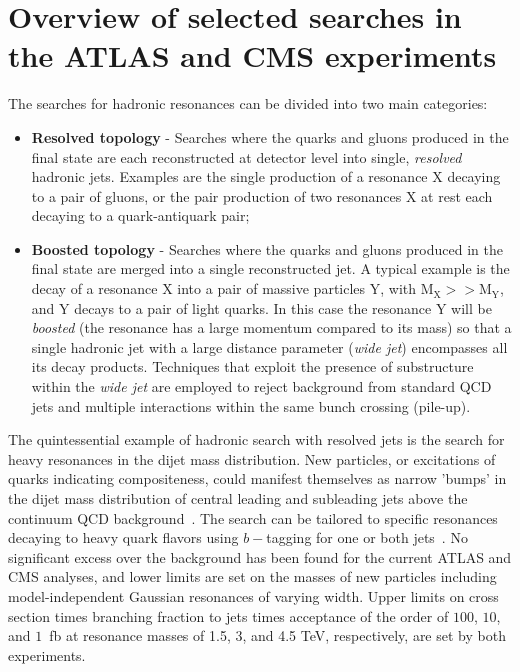 \documentclass{PoS}
\begin{document}
\section{Overview of selected searches in the ATLAS and CMS experiments}

The searches for hadronic resonances can be divided into two main categories:
\begin{itemize}
 \item {\bf Resolved topology} - Searches where the quarks and gluons produced in the final state are each reconstructed at detector level into single,  \textit{resolved} hadronic jets. Examples are the single production of a resonance X decaying to a pair of gluons, or the pair production of two resonances X at rest each decaying to a quark-antiquark pair;
 \item {\bf Boosted topology} - Searches where the quarks and gluons produced in the final state are merged into a single reconstructed jet.  A typical example is the decay of a resonance X into a pair of massive particles Y, with $\mbox{M}_{\mbox{X}} >>\mbox{M}_{\mbox{Y}} $, and Y decays to a pair of light quarks. In this case the resonance Y will be \textit{boosted} 
(the resonance has a large momentum compared to its mass) so that a single hadronic jet with a large distance 
parameter (\textit{wide jet}) encompasses all its decay products. Techniques that exploit the presence of substructure within the \textit{wide jet} are employed to reject background from standard QCD jets and multiple interactions within the same bunch crossing (pile-up). 
\end{itemize}

The quintessential example of hadronic search with resolved jets is the 
search for heavy resonances in the dijet mass distribution. New particles, 
or excitations of quarks indicating 
compositeness,
could manifest 
themselves as narrow 'bumps' in the dijet mass distribution of central leading
and subleading jets above the continuum QCD background~\cite{CMS-PAS-EXO-12-059, ATLAS-CONF-2012-148}. 
The search can be tailored to specific resonances
decaying to heavy quark flavors using $b-$tagging for one or both jets~\cite{CMS-PAS-EXO-12-023}. 
No significant excess over the background has been found for the current ATLAS and CMS analyses,
and lower limits are set on the masses of new particles 
including model-independent Gaussian resonances of varying width.
Upper limits on cross section times branching fraction to jets times acceptance of the order of $100$, $10$, and 
$1$~fb at resonance masses of 1.5, 3, and 4.5 TeV, respectively, are set by both experiments.
\end{document}
